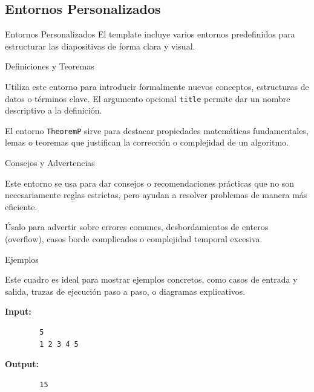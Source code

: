 \subsection{Entornos Personalizados}

\begin{frame}{Entornos Personalizados}
    El template incluye varios entornos predefinidos para estructurar las
    diapositivas de forma clara y visual.
\end{frame}

\begin{frame}{Definiciones y Teoremas}
    \begin{DefinitionP}[title=Definición Formal]
        Utiliza este entorno para introducir formalmente nuevos conceptos,
        estructuras de datos o términos clave. El argumento opcional
        \texttt{title} permite dar un nombre descriptivo a la definición.
    \end{DefinitionP}

    \begin{TheoremP}[title=Propiedad Matemática]
        El entorno \texttt{TheoremP} sirve para destacar propiedades matemáticas
        fundamentales, lemas o teoremas que justifican la corrección o
        complejidad de un algoritmo.
    \end{TheoremP}
\end{frame}

\begin{frame}{Consejos y Advertencias}
    \begin{TipP}
        Este entorno se usa para dar consejos o recomendaciones prácticas que
        no son necesariamente reglas estrictas, pero ayudan a resolver
        problemas de manera más eficiente.
    \end{TipP}

    \begin{AlertP}
        Úsalo para advertir sobre errores comunes, desbordamientos de enteros
        (overflow), casos borde complicados o complejidad temporal excesiva.
    \end{AlertP}
\end{frame}

\begin{frame}[fragile]{Ejemplos}
    \begin{ExampleP}[title=Caso de Prueba]
        Este cuadro es ideal para mostrar ejemplos concretos, como casos de
        entrada y salida, trazas de ejecución paso a paso, o diagramas
        explicativos.
        
        \textbf{Input:}
        \begin{verbatim}
        5
        1 2 3 4 5
        \end{verbatim}

        \textbf{Output:}
        \begin{verbatim}
        15
        \end{verbatim}
    \end{ExampleP}
\end{frame}
